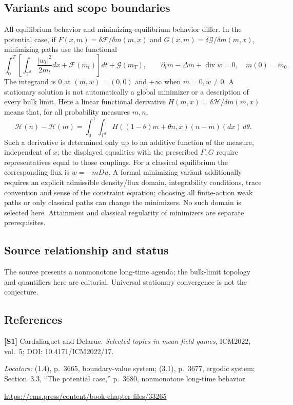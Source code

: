 \documentclass[11pt,a4paper]{article}
\begin{document}
\subsection*{Variants and scope boundaries}
All-equilibrium behavior and minimizing-equilibrium behavior differ. In the potential case, if $F(x,m)=\delta\mathcal F/\delta m(m,x)$ and $G(x,m)=\delta\mathcal G/\delta m(m,x)$, minimizing paths use the functional
\[
 \int_0^T\left[\int_{\mathbb T^d}\frac{|w_t|^2}{2m_t}dx+\mathcal F(m_t)\right]dt
 +\mathcal G(m_T),\qquad
 \partial_t m-\Delta m+\operatorname{div}w=0,\quad m(0)=m_0.
\]
The integrand is $0$ at $(m,w)=(0,0)$ and $+\infty$ when $m=0,w\ne0$. A stationary solution is not automatically a global minimizer or a description of every bulk limit.
Here a linear functional derivative $H(m,x)=\delta\mathcal H/\delta m(m,x)$ means that, for all probability measures $m,n$,
\[
 \mathcal H(n)-\mathcal H(m)=\int_0^1\int_{\mathbb T^d}
 H((1-\theta)m+\theta n,x)(n-m)(dx)\,d\theta.
\]
Such a derivative is determined only up to an additive function of the measure, independent of $x$; the displayed equalities with the prescribed $F,G$ require representatives equal to those couplings. For a classical equilibrium the corresponding flux is $w=-mDu$. A formal minimizing variant additionally requires an explicit admissible density/flux domain, integrability conditions, trace convention and sense of the constraint equation; choosing all finite-action weak paths or only classical paths can change the minimizers. No such domain is selected here. Attainment and classical regularity of minimizers are separate prerequisites.
\subsection*{Source relationship and status}
The source presents a nonmonotone long-time agenda; the bulk-limit topology and quantifiers here are editorial. Universal stationary convergence is not the conjecture.
\subsection*{References}
\begingroup\footnotesize\raggedright
{\footnotesize\raggedright
\textbf{[S1]} Cardaliaguet and Delarue. \emph{Selected topics in mean field games}, ICM2022, vol.~5; DOI: 10.4171/ICM2022/17.\par
\textit{Locators:} (1.4), p.~3665, boundary-value system; (3.1), p.~3677, ergodic system; Section~3.3, ``The potential case,'' p.~3680, nonmonotone long-time behavior.\par
\url{https://ems.press/content/book-chapter-files/33265}\par}
\par\endgroup
\end{document}

